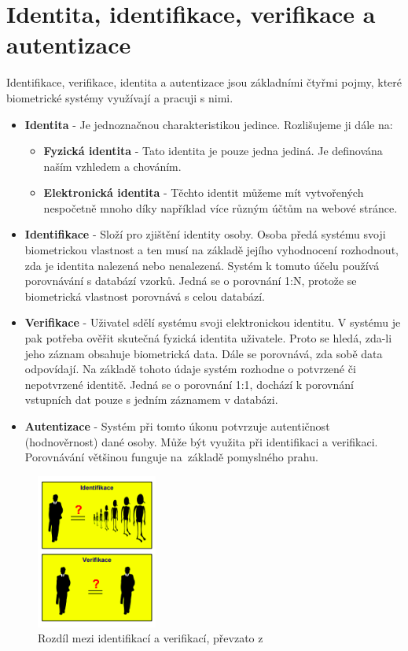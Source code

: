 \section{Identita, identifikace, verifikace a autentizace}
Identifikace, verifikace, identita a autentizace jsou základními čtyřmi pojmy, které biometrické systémy využívají a pracuji s nimi. \cite{Drahansky}
\begin{itemize}
    \item \textbf{Identita} - Je jednoznačnou charakteristikou jedince. Rozlišujeme ji dále na:
        \begin{itemize}
            \item \textbf{Fyzická identita} - Tato identita je pouze jedna jediná. Je definována naším vzhledem a chováním.
            \item \textbf{Elektronická identita} - Těchto identit můžeme mít vytvořených nespočetně mnoho díky například více různým účtům na webové stránce.
        \end{itemize}
    \item \textbf{Identifikace} - Složí pro zjištění identity osoby. Osoba předá systému svoji biometrickou vlastnost a ten musí na základě jejího vyhodnocení rozhodnout, zda je identita nalezená nebo nenalezená. Systém k tomuto účelu používá porovnávání s databází vzorků. Jedná se o porovnání 1:N, protože se biometrická vlastnost porovnává s celou databází.
    \item \textbf{Verifikace} - Uživatel sdělí systému svoji elektronickou identitu. V systému je pak potřeba ověřit skutečná fyzická identita uživatele. Proto se hledá, zda-li jeho záznam obsahuje biometrická data. Dále se porovnává, zda sobě data odpovídají. Na základě tohoto údaje systém rozhodne o potvrzené či nepotvrzené identitě. Jedná se o porovnání 1:1, dochází k porovnání vstupních dat pouze s jedním záznamem v databázi.
    \item \textbf{Autentizace} - Systém při tomto úkonu potvrzuje autentičnost (hodnověrnost) dané osoby. Může být využita při identifikaci a verifikaci. Porovnávání většinou funguje na~základě pomyslného prahu.
\end{itemize}

\begin{figure}[!htbp]
    \centering
    \includegraphics[width=150px]{obrazky-figures/identifver.png}
    \caption{Rozdíl mezi identifikací a verifikací, převzato z \cite{Drahansky}}
\end{figure}




